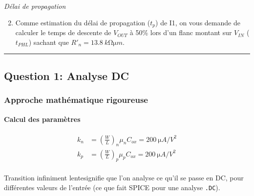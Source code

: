 \documentclass[frenchb,DIV=14]{scrartcl}
\begin{document}
\emph{Délai de propagation}
\begin{enumerate}
	\setcounter{enumi}{1}
	\item Comme estimation du délai de propagation ($t_p$) de I1, on vous demande de
	calculer le temps de descente de $V_{OUT}$ à 50\% lors d'un flanc montant sur $V_{IN}$
        ($t_{PHL}$) sachant que $R'_n =\SI{13.8}{k\ohm\micro m}$.
\end{enumerate}

\hspace{1cm}\hrule

\subsection*{Question 1: Analyse DC}
\subsubsection*{Approche mathématique rigoureuse}
\paragraph{Calcul des paramètres}
\begin{align*}
    k_n &= \left(\frac{W}{L}\right)_n \mu_n C_{ox} = \SI{200}{\micro A/V^2} \\
    k_p &= \left(\frac{W}{L}\right)_p \mu_p C_{ox} = \SI{200}{\micro A/V^2} \\
\end{align*}

\og Transition infiniment lente\fg signifie que l'on analyse ce qu'il se passe
en DC, pour différentes valeurs de l'entrée (ce que fait SPICE pour une analyse
\texttt{.DC}).
\end{document}
